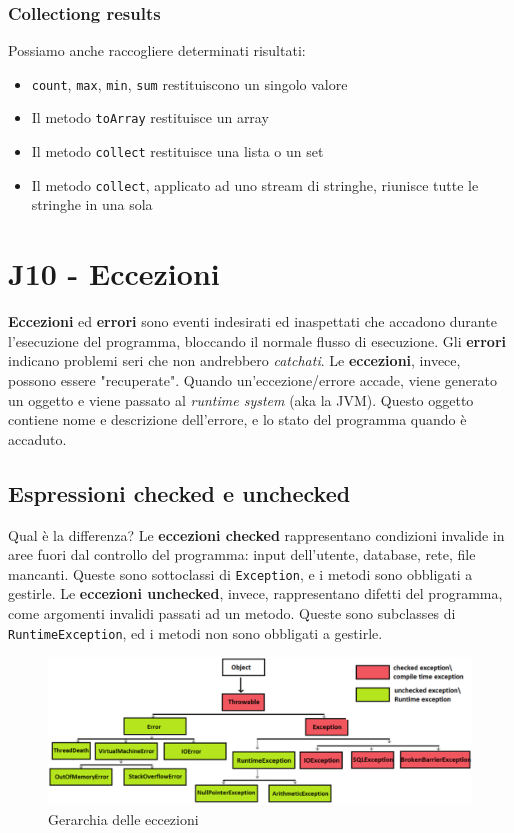 \documentclass[11pt]{article}
\newcommand{\code}[1]{\texttt{#1}}
\begin{document}
\subsubsection{Collectiong results}
Possiamo anche raccogliere determinati risultati:
\begin{itemize}
    \item \code{count}, \code{max}, \code{min}, \code{sum} restituiscono un singolo valore
    \item Il metodo \code{toArray} restituisce un array 
    \item Il metodo \code{collect} restituisce una lista o un set
    \item Il metodo \code{collect}, applicato ad uno stream di stringhe, riunisce tutte le stringhe in una sola
\end{itemize}
\section{J10 - Eccezioni}
\textbf{Eccezioni} ed \textbf{errori} sono eventi indesirati ed inaspettati che accadono durante l'esecuzione del programma, bloccando il normale flusso di esecuzione. Gli \textbf{errori} indicano problemi seri che non andrebbero \textit{catchati}. Le \textbf{eccezioni}, invece, possono essere "recuperate". Quando un'eccezione/errore accade, viene generato un oggetto e viene passato al \textit{runtime system} (aka la JVM). Questo oggetto contiene nome e descrizione dell'errore, e lo stato del programma quando è accaduto.
\subsection{Espressioni checked e unchecked}
Qual è la differenza? Le \textbf{eccezioni checked} rappresentano condizioni invalide in aree fuori dal controllo del programma: input dell'utente, database, rete, file mancanti. Queste sono sottoclassi di \code{Exception}, e i metodi sono obbligati a gestirle. Le \textbf{eccezioni unchecked}, invece, rappresentano difetti del programma, come argomenti invalidi passati ad un metodo. Queste sono subclasses di \code{RuntimeException}, ed i metodi non sono obbligati a gestirle. 
\begin{figure}[H]
    \centering
    \includegraphics[width=0.8\linewidth]{res/java/Exceptions.png}
    \caption{Gerarchia delle eccezioni}
\end{figure}
\end{document}
